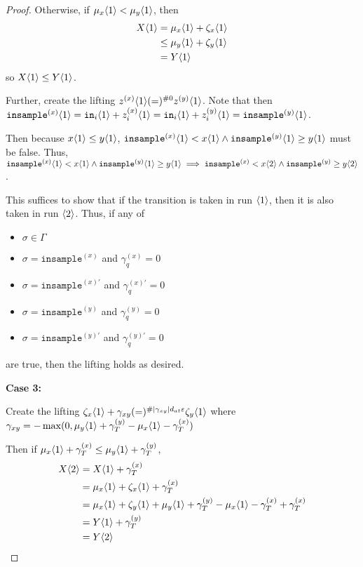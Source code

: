 \begin{proof}
    Otherwise, if $\mu_x\langle1 \rangle<\mu_y\langle1 \rangle$, then \begin{align*}
        X\langle1 \rangle&= \mu_x\langle1 \rangle + \zeta_x\langle1 \rangle\\
        &\leq \mu_y\langle1 \rangle+\zeta_y\langle1 \rangle\\
        &=Y\langle1 \rangle
    \end{align*}
    so $X\langle1 \rangle\leq Y\langle1 \rangle$.

    Further, create the lifting $z^{(x)}\langle1 \rangle(=)^{\#0}z^{(y)}\langle1 \rangle$. Note that then $\texttt{insample}^{(x)}\langle1 \rangle=\texttt{in}_i\langle1 \rangle + z_i^{(x)}\langle1 \rangle =\texttt{in}_i\langle1 \rangle + z_i^{(y)}\langle1 \rangle=\texttt{insample}^{(y)}\langle1 \rangle$.

    Then because $x\langle1 \rangle \leq y\langle1 \rangle$, $\texttt{insample}^{(x)}\langle1 \rangle<x\langle1 \rangle\land\texttt{insample}^{(y)}\langle1 \rangle\geq y\langle1 \rangle$ must be false. Thus, $\texttt{insample}^{(x)}\langle1 \rangle<x\langle1 \rangle\land\texttt{insample}^{(y)}\langle1 \rangle\geq y\langle1 \rangle\implies \texttt{insample}^{(x)}<x\langle2 \rangle\land\texttt{insample}^{(y)}\geq y\langle2 \rangle$.

    This suffices to show that if the transition is taken in run $\langle1 \rangle$, then it is also taken in run $\langle2 \rangle$. Thus, if any of \begin{itemize}
        \item $\sigma \in \Gamma$
        \item $\sigma = \texttt{insample}^{(x)}$ and $\gamma_q^{(x)}=0$ 
        \item $\sigma = \texttt{insample}^{(x)\prime}$ and $\gamma_q^{(x)\prime}=0$ 
        \item $\sigma = \texttt{insample}^{(y)}$ and $\gamma_q^{(y)}=0$
        \item $\sigma = \texttt{insample}^{(y)\prime}$ and $\gamma_q^{(y)\prime}=0$
    \end{itemize}
    are true, then the lifting holds as desired. 

    \textbf{Case 3:}
    
    Create the lifting $\zeta_x\langle1 \rangle + \gamma_{xy} (=)^{\#|\gamma_{xy}|d_{at}\varepsilon} \zeta_y\langle1 \rangle$ where $\gamma_{xy} = -\max(0, \mu_y\langle1 \rangle+ \gamma_T^{(y)}-\mu_x\langle1 \rangle-\gamma_T^{(x)})$

    Then if $\mu_x\langle1 \rangle+\gamma_T^{(x)}\leq \mu_y\langle1 \rangle+\gamma_T^{(y)}$, \begin{align*}
        X\langle2 \rangle &= X\langle1 \rangle + \gamma_T^{(x)}\\
        &=\mu_x\langle1 \rangle + \zeta_x\langle1 \rangle + \gamma_T^{(x)}\\
        &=\mu_x\langle1 \rangle +\zeta_y\langle1 \rangle + \mu_y\langle1 \rangle+ \gamma_T^{(y)}-\mu_x\langle1 \rangle-\gamma_T^{(x)} +\gamma_T^{(x)}\\
        &=Y\langle1 \rangle + \gamma_T^{(y)}\\
        &= Y\langle2 \rangle
    \end{align*}


\end{proof}

